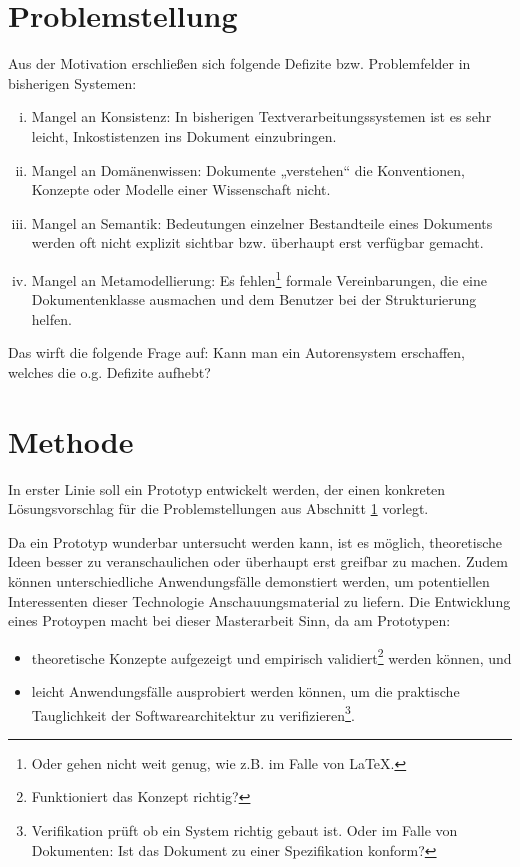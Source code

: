  
\section{Problemstellung}\label{problemstellung}
 
Aus der Motivation erschließen sich folgende Defizite bzw. Problemfelder in bisherigen Systemen:

 
\begin{enumerate}[(i)]

\item
Mangel an Konsistenz: In bisherigen Textverarbeitungssystemen ist es sehr leicht, Inkostistenzen ins Dokument einzubringen.


\item
Mangel an Domänenwissen: Dokumente „verstehen“ die Konventionen, Konzepte oder Modelle einer Wissenschaft nicht.


\item
Mangel an Semantik: Bedeutungen einzelner Bestandteile eines Dokuments werden oft nicht explizit sichtbar bzw. überhaupt erst verfügbar gemacht.


\item
Mangel an Metamodellierung: Es fehlen\footnote{Oder gehen nicht weit genug, wie z.B. im Falle von LaTeX.} formale Vereinbarungen, die eine Dokumentenklasse ausmachen und dem Benutzer bei der Strukturierung helfen.


\end{enumerate}
 
Das wirft die folgende Frage auf: Kann man ein Autorensystem erschaffen, welches die o.g. Defizite aufhebt?

 
\section{Methode}\label{}
 
In erster Linie soll ein Prototyp entwickelt werden, der einen konkreten Lösungsvorschlag für die Problemstellungen aus Abschnitt \ref{problemstellung} vorlegt.

 
Da ein Prototyp wunderbar untersucht werden kann, ist es möglich, theoretische Ideen besser zu veranschaulichen oder überhaupt erst greifbar zu machen. Zudem können unterschiedliche Anwendungsfälle demonstiert werden, um potentiellen Interessenten dieser Technologie Anschauungsmaterial zu liefern. Die Entwicklung eines Protoypen macht bei dieser Masterarbeit Sinn, da am Prototypen:

 
\begin{itemize}

\item theoretische Konzepte aufgezeigt und empirisch validiert\footnote{Funktioniert das Konzept richtig?} werden können, und
\item leicht Anwendungsfälle ausprobiert werden können, um die praktische Tauglichkeit der Softwarearchitektur zu verifizieren\footnote{Verifikation prüft ob ein System richtig gebaut ist. Oder im Falle von Dokumenten: Ist das Dokument zu einer Spezifikation konform?}.
\end{itemize}
 
